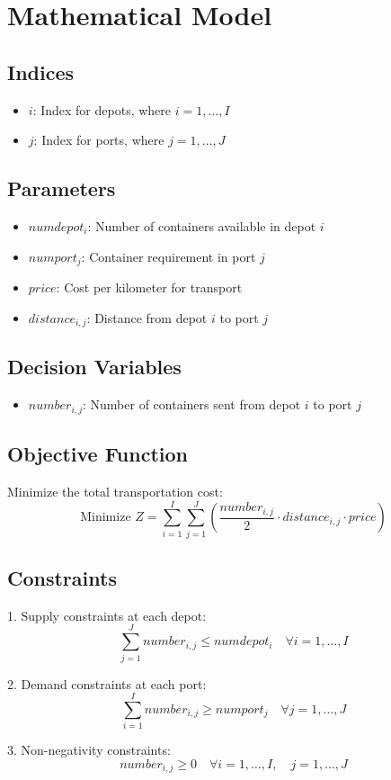 \documentclass{article}
\begin{document}
\section*{Mathematical Model}

\subsection*{Indices}
\begin{itemize}
    \item $i$: Index for depots, where $i = 1, \ldots, I$
    \item $j$: Index for ports, where $j = 1, \ldots, J$
\end{itemize}

\subsection*{Parameters}
\begin{itemize}
    \item $numdepot_i$: Number of containers available in depot $i$
    \item $numport_j$: Container requirement in port $j$
    \item $price$: Cost per kilometer for transport
    \item $distance_{i,j}$: Distance from depot $i$ to port $j$
\end{itemize}

\subsection*{Decision Variables}
\begin{itemize}
    \item $number_{i,j}$: Number of containers sent from depot $i$ to port $j$
\end{itemize}

\subsection*{Objective Function}
Minimize the total transportation cost:
\[
\text{Minimize } Z = \sum_{i=1}^{I} \sum_{j=1}^{J} \left(\frac{number_{i,j}}{2} \cdot distance_{i,j} \cdot price\right)
\]

\subsection*{Constraints}
1. Supply constraints at each depot:
\[
\sum_{j=1}^{J} number_{i,j} \leq numdepot_i \quad \forall i = 1, \ldots, I
\]

2. Demand constraints at each port:
\[
\sum_{i=1}^{I} number_{i,j} \geq numport_j \quad \forall j = 1, \ldots, J
\]

3. Non-negativity constraints:
\[
number_{i,j} \geq 0 \quad \forall i = 1, \ldots, I, \quad j = 1, \ldots, J
\]
\end{document}

